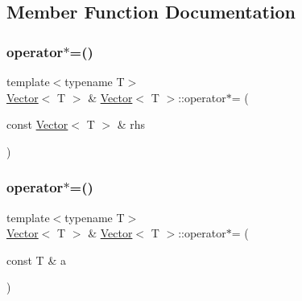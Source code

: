\subsection{Member Function Documentation}
\mbox{\label{classVector_a3b3e94a4ee6601a8c3ceaed790c2d965}} 
\subsubsection{\texorpdfstring{operator$\ast$=()}{operator*=()}\hspace{0.1cm}{\footnotesize\ttfamily [1/2]}}
{\footnotesize\ttfamily template$<$typename T$>$ \\
\mbox{\hyperlink{classVector}{Vector}}$<$ T $>$ \& \mbox{\hyperlink{classVector}{Vector}}$<$ T $>$\+::operator$\ast$= (\begin{DoxyParamCaption}\item[{const \mbox{\hyperlink{classVector}{Vector}}$<$ T $>$ \&}]{rhs }\end{DoxyParamCaption})\hspace{0.3cm}{\ttfamily [inline]}}

\mbox{\label{classVector_a02e9c5296c7ddb1a2047a8c80d93e0d5}} 
\subsubsection{\texorpdfstring{operator$\ast$=()}{operator*=()}\hspace{0.1cm}{\footnotesize\ttfamily [2/2]}}
{\footnotesize\ttfamily template$<$typename T$>$ \\
\mbox{\hyperlink{classVector}{Vector}}$<$ T $>$ \& \mbox{\hyperlink{classVector}{Vector}}$<$ T $>$\+::operator$\ast$= (\begin{DoxyParamCaption}\item[{const T \&}]{a }\end{DoxyParamCaption})\hspace{0.3cm}{\ttfamily [inline]}}

\mbox{\label{classVector_a0cdad8a65e9dd1ef60afaf32aa547f9e}} 

